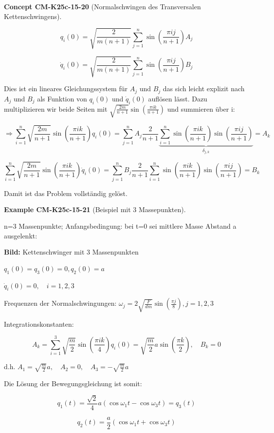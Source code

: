\documentclass[10pt, letterpaper]{article}
\newcommand{\CustomHeading}[3]{%
  \par\medskip\noindent%
  \textbf{#1 #2} \textnormal{(#3)}.\enskip%
}
\newenvironment{EXA}[2]{\CustomHeading{Example}{#1}{#2}}{}
\newenvironment{CONC}[2]{\CustomHeading{Concept}{#1}{#2}}{}
\begin{document}
\begin{CONC}{CM-K25c-15-20}{Normalschwingen des Transversalen Kettenschwingens}
\[
q_i(0) = \sqrt{\frac{2}{m(n+1)}}\sum_{j=1}^n\sin\left(\frac{\pi ij}{n+1}\right)A_j
\]

\[
\dot{q}_i(0) = \sqrt{\frac{2}{m(n+1)}}\sum_{j=1}^n\sin\left(\frac{\pi ij}{n+1}\right)B_j
\]

Dies ist ein lineares Gleichungssystem für $A_j$ und $B_j$ das sich leicht explizit nach $A_j$ und $B_j$ als Funktion von
$q_i(0)$ und $\dot{q}_i(0)$ auflösen lässt. Dazu multiplizieren wir beide Seiten mit $\sqrt{\frac{2m}{n+1}}\sin\left(\frac{\pi ik}{n+1}\right)$ und summieren über i:

\[\Rightarrow \sum_{i=1}^n \sqrt{\frac{2m}{n+1}}\sin\left(\frac{\pi ik}{n+1}\right)q_i(0) = \sum_{j=1}^n A_j \frac{2}{n+1} \underbrace{\sum_{i=1}^n \sin\left(\frac{\pi ik}{n+1}\right)\sin\left(\frac{\pi ij}{n+1}\right)}_{\delta_{j,k}} = A_k\]

\[\sum_{i=1}^n \sqrt{\frac{2m}{n+1}}\sin\left(\frac{\pi ik}{n+1}\right)\dot{q}_i(0) = \sum_{j=1}^n B_j \frac{2}{n+1} \sum_{i=1}^n \sin\left(\frac{\pi ik}{n+1}\right)\sin\left(\frac{\pi ij}{n+1}\right) = B_k\]

Damit ist das Problem vollständig gelöst.
\end{CONC}

\begin{EXA}{CM-K25c-15-21}{Beispiel mit 3 Massepunkten}
n=3 Massenpunkte; Anfangsbedingung: bei t=0 sei mittlere Masse Abstand a ausgelenkt:

\textbf{Bild:} Kettenschwinger mit 3 Massenpunkten

$q_1(0) = q_3(0) = 0, q_2(0) = a$

$\dot{q}_i(0) = 0, \quad i=1,2,3$

Frequenzen der Normalschwingungen: $\omega_j = 2\sqrt{\frac{F}{dm}}\sin\left(\frac{\pi j}{8}\right), j=1,2,3$

Integrationskonstanten:

\[A_k = \sum_{i=1}^3 \sqrt{\frac{m}{2}}\sin\left(\frac{\pi ik}{4}\right)q_i(0) = \sqrt{\frac{m}{2}}a\sin\left(\frac{\pi k}{2}\right), \quad B_k = 0\]

d.h. $A_1 = \sqrt{\frac{m}{2}}a, \quad A_2 = 0, \quad A_3 = -\sqrt{\frac{m}{2}}a$

Die Lösung der Bewegungsgleichung ist somit:

\[q_1(t) = \frac{\sqrt{2}}{4}a(\cos\omega_1t - \cos\omega_3t) = q_3(t)\]

\[q_2(t) = \frac{a}{2}(\cos\omega_1t + \cos\omega_3t)\]
\end{EXA}
\end{document}
